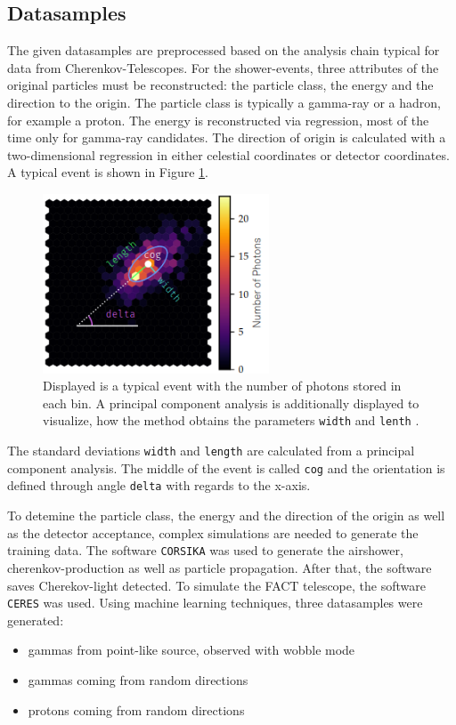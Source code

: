 \subsection{Datasamples}
The given datasamples are preprocessed based on the analysis chain typical for data from Cherenkov-Telescopes.
For the shower-events, three attributes of the original particles must be reconstructed: the particle class, the energy and the direction to the origin.
The particle class is typically a gamma-ray or a hadron, for example a proton. The energy is reconstructed via 
regression, most of the time only for gamma-ray candidates. The direction of origin is calculated with a two-dimensional regression in 
either celestial coordinates or detector coordinates.
A typical event is shown in Figure \ref{fig:event}.
\begin{figure}
  \centering
  \includegraphics[width=0.6\textwidth]{fact_pics/event.png}
  \caption{Displayed is a typical event with the number of photons stored in each bin. A principal component analysis is additionally displayed to 
  visualize, how the method obtains the parameters \texttt{width} and \texttt{lenth} \cite{ANLEITUNG}.}
  \label{fig:event}
\end{figure}
The standard deviations \texttt{width} and \texttt{length} are calculated from a principal component analysis. 
The middle of the event is called \texttt{cog} and the orientation is defined through angle \texttt{delta} with regards to the x-axis.

To detemine the particle class, the energy and the direction of the origin as well as the detector acceptance, complex simulations are needed to generate 
the training data.
The software \texttt{CORSIKA} was used to generate the airshower, cherenkov-production as well as particle propagation. After that, the software 
saves Cherekov-light detected.
To simulate the FACT telescope, the software \texttt{CERES} was used. Using machine learning techniques, three datasamples were generated:
\begin{itemize}
  \item gammas from point-like source, observed with wobble mode
  \item gammas coming from random directions
  \item protons coming from random directions
\end{itemize}

